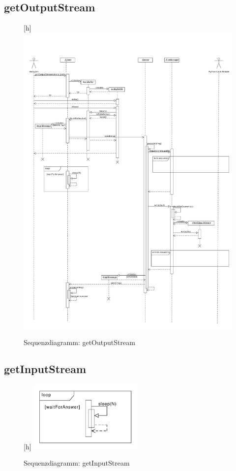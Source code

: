\subsection {getOutputStream}
\begin{figure}[h]
	\centering
	\label{design:dia:sqc:getOutputStream}[h]
	\includegraphics[width=\textwidth]{design/frontend/sequence/get-output-stream-sequence.pdf}
	\caption{Sequenzdiagramm: getOutputStream}
\end{figure}

\subsection {getInputStream}
\begin{figure}[h]
	\centering
	\label{design:dia:sqc:getInputStream}[h]
	\includegraphics[width=0.5\textwidth]{design/frontend/sequence/get-input-stream-sequence.pdf}
	\caption{Sequenzdiagramm: getInputStream}
\end{figure}

